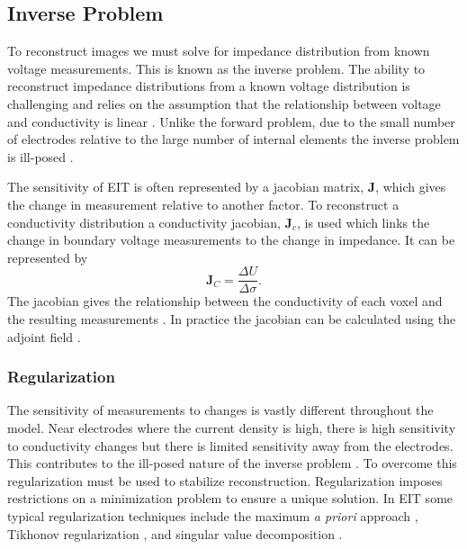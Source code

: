 \subsection{Inverse Problem} \label{sec:inv_prob}
To reconstruct images we must solve for impedance distribution from known voltage measurements. 
This is known as the inverse problem. 
The ability to reconstruct impedance distributions from a known voltage distribution is challenging 
and relies on the assumption that the relationship between voltage and conductivity is 
linear \parencite{barber_applied_1984}.
Unlike the forward problem, due to the small number of electrodes 
relative to the large number of internal elements the inverse problem is
ill-posed \parencite{holder_electrical_2004}.

The sensitivity of EIT is often represented by a jacobian matrix, $\mathbf{J}$,
which gives the change in measurement relative to another factor. To reconstruct 
a conductivity distribution a conductivity jacobian, $\mathbf{J}_c$, is used
which links the change 
in boundary voltage measurements to the change in impedance. It can be represented by 
\begin{equation} \label{eq:jacobian_c}
	\mathbf{J}_C = \frac{\Delta U}{\Delta \sigma}. 
\end{equation}
The jacobian gives the relationship between the conductivity of each voxel and the resulting
measurements \parencite{holder_electrical_2004}.
In practice the jacobian can be calculated using the adjoint 
field \parencite{vauhkonen_three-dimensional_1999}. 

\subsubsection{Regularization}
The sensitivity of measurements to changes is vastly different throughout the model. 
Near electrodes where the current density is high, there is high sensitivity to conductivity 
changes but there is limited sensitivity away from the electrodes. This contributes 
to the ill-posed nature of the inverse problem \parencite{holder_electrical_2004}.
To overcome this regularization must be used to stabilize reconstruction. 
Regularization imposes restrictions on a minimization problem to ensure a unique solution.
In EIT some typical regularization techniques include the maximum \emph{a priori} approach
\parencite{adler_electrical_1996}, Tikhonov regularization \parencite{vauhkonen_tikhonov_1998},
and singular value decomposition \parencite{ostebee_rank-deficient_1998}.

